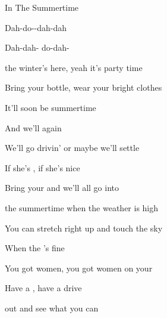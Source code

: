 \begin{SBSong}{In The Summertime}
\begin{SBVerse}
    Dah-do--dah-dah

    Dah-dah- do-dah-
  \end{SBVerse}
  \begin{SBVerse}
     the winter's here, yeah it's party time

    Bring your bottle, wear your bright clothes

    It'll soon be summertime

    And we'll  again

    We'll go drivin' or maybe we'll settle 

    If she's , if she's nice

    Bring your  and we'll all go into 
  \end{SBVerse}
  \begin{SBVerse}
     the summertime when the weather is high

    You can stretch right up and touch the sky

    When the 's fine

    You got women, you got women on your 

    Have a , have a drive

     out and see what you can 
  \end{SBVerse}
\end{SBSong}

